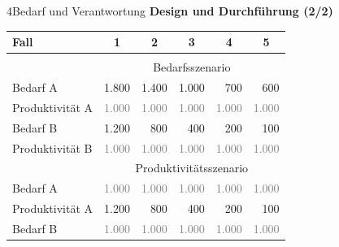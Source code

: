 \documentclass[xcolor=table,9pt,aspectratio=169]{beamer}
\begin{document}
\begin{frame}{\vspace*{10mm}4\hspace*{1em}Bedarf und Verantwortung}
\textbf{Design und Durchführung (2/2)}\\
\medskip
\begin{center}
   \begin{tabular}{lrrrrr}
      \arrayrulecolor{blue2}
      \hline
      Fall                      & \multicolumn{1}{c}{1}     & \multicolumn{1}{c}{2}     & \multicolumn{1}{c}{3}     & \multicolumn{1}{c}{4}   & \multicolumn{1}{c}{5}       \\
      \hline\hline\\[-0.5em]
                                & \multicolumn{5}{c}{Bedarfsszenario}                                                                                                       \\[0.5em]
      Bedarf A                  &                  1.800    &                  1.400    &                  1.000    &                    700    &                    600    \\
      Produktivität A           & \textcolor{gray}{1.000}   & \textcolor{gray}{1.000}   & \textcolor{gray}{1.000}   & \textcolor{gray}{1.000}   & \textcolor{gray}{1.000}   \\[0.5em]
      Bedarf B                  &                  1.200    &                    800    &                    400    &                    200    &                    100    \\
      Produktivität B           & \textcolor{gray}{1.000}   & \textcolor{gray}{1.000}   & \textcolor{gray}{1.000}   & \textcolor{gray}{1.000}   & \textcolor{gray}{1.000}   \\
      \hline
                                & \multicolumn{5}{c}{Produktivitätsszenario}                                                                                                \\[0.5em]
      Bedarf A                  & \textcolor{gray}{1.000}   & \textcolor{gray}{1.000}   & \textcolor{gray}{1.000}   & \textcolor{gray}{1.000}   & \textcolor{gray}{1.000}   \\
      Produktivität A           &                  1.200    &                    800    &                    400    &                    200    &                    100    \\[0.5em]
      Bedarf B                  & \textcolor{gray}{1.000}   & \textcolor{gray}{1.000}   & \textcolor{gray}{1.000}   & \textcolor{gray}{1.000}   & \textcolor{gray}{1.000}   \\

\end{tabular}
\end{center}
\end{frame}
\end{document}
